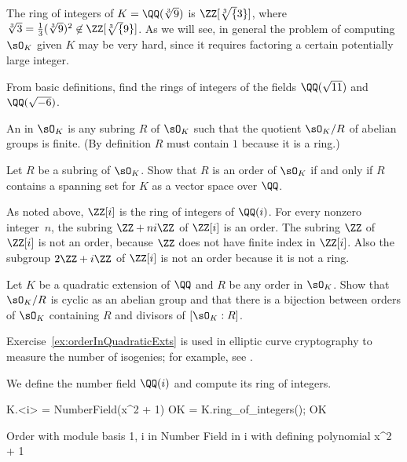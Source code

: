 \begin{example}
  The ring of integers of $K=\QQ(\sqrt[3]{9})$ is $\ZZ[\sqrt[3]{3}]$,
  where $\sqrt[3]{3}=\frac{1}{3}(\sqrt[3]{9})^2 \not \in \ZZ[\sqrt[3]{9}]$.
  As we will see, in general the problem of computing $\sO_K$ given $K$
  may be very hard, since it requires factoring a certain potentially
  large integer.
\end{example}

\begin{exercise}
  From basic definitions, find the rings of integers of the fields
  $\QQ(\sqrt{11})$ and $\QQ(\sqrt{-6})$.
\end{exercise}

\begin{definition}[Order]\label{defn:order}
  An  in $\sO_K$ is any subring $R$ of $\sO_K$ such that
  the quotient $\sO_K/R$ of abelian groups is finite.
  (By definition $R$ must contain $1$ because it is a ring.)
\end{definition}

\begin{exercise}
  Let $R$ be a subring of $\sO_K$. Show that $R$ is an order of $\sO_K$
  if and only if $R$ contains a spanning set for $K$ as a vector space
  over $\QQ$.
\end{exercise}

As noted above, $\ZZ[i]$ is the ring of integers of $\QQ(i)$.  For every
nonzero integer~$n$, the subring $\ZZ+ni\ZZ$ of $\ZZ[i]$ is an order.
The subring $\ZZ$ of $\ZZ[i]$ is not an order, because $\ZZ$ does not
have finite index in $\ZZ[i]$.  Also the subgroup $2\ZZ + i\ZZ$ of
$\ZZ[i]$ is not an order because it is not a ring.

\begin{exercise}\label{ex:orderInQuadraticExts}
  Let $K$ be a quadratic extension of $\QQ$
  and $R$ be any order in $\sO_K$.
  Show that $\sO_K/R$ is cyclic as an abelian group
  and that there is a bijection between orders of
  $\sO_K$ containing $R$ and divisors of $[\sO_K:R]$.
\end{exercise}

\begin{remark}
  Exercise~\ref{ex:orderInQuadraticExts} is used in
  elliptic curve cryptography to measure the number
  of isogenies; for example, see \cite[\S11.2]{Koblitz2011781}.
\end{remark}

We define the number field $\QQ(i)$ and compute its
ring of integers.
\begin{sagecode}
\begin{sagecell}
K.<i> = NumberField(x^2 + 1)
OK = K.ring_of_integers(); OK
\end{sagecell}
\begin{sageout}
Order with module basis 1, i in Number Field in i with
defining polynomial x^2 + 1
\end{sageout}
\end{sagecode}

